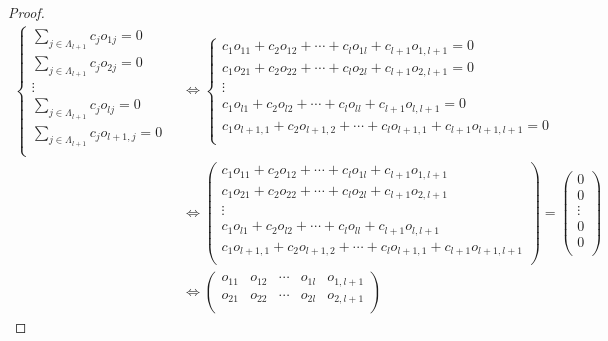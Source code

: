 \documentclass[dvipdfmx]{jsarticle}
\begin{document}
\begin{proof}
\begin{align*}
\left\{ \begin{matrix}
\sum_{j \in \varLambda_{l + 1}} {c_{j}o_{1j}} = 0 \\
\sum_{j \in \varLambda_{l + 1}} {c_{j}o_{2j}} = 0 \\
 \vdots \\
\sum_{j \in \varLambda_{l + 1}} {c_{j}o_{lj}} = 0 \\
\sum_{j \in \varLambda_{l + 1}} {c_{j}o_{l + 1,j}} = 0 \\
\end{matrix} \right.\  &\Leftrightarrow \left\{ \begin{matrix}
c_{1}o_{11} + c_{2}o_{12} + \cdots + c_{l}o_{1l} + c_{l + 1}o_{1,l + 1} = 0 \\
c_{1}o_{21} + c_{2}o_{22} + \cdots + c_{l}o_{2l} + c_{l + 1}o_{2,l + 1} = 0 \\
 \vdots \\
c_{1}o_{l1} + c_{2}o_{l2} + \cdots + c_{l}o_{ll} + c_{l + 1}o_{l,l + 1} = 0 \\
c_{1}o_{l + 1,1} + c_{2}o_{l + 1,2} + \cdots + c_{l}o_{l + 1,1} + c_{l + 1}o_{l + 1,l + 1} = 0 \\
\end{matrix} \right.\ \\
&\Leftrightarrow \begin{pmatrix}
c_{1}o_{11} + c_{2}o_{12} + \cdots + c_{l}o_{1l} + c_{l + 1}o_{1,l + 1} \\
c_{1}o_{21} + c_{2}o_{22} + \cdots + c_{l}o_{2l} + c_{l + 1}o_{2,l + 1} \\
 \vdots \\
c_{1}o_{l1} + c_{2}o_{l2} + \cdots + c_{l}o_{ll} + c_{l + 1}o_{l,l + 1} \\
c_{1}o_{l + 1,1} + c_{2}o_{l + 1,2} + \cdots + c_{l}o_{l + 1,1} + c_{l + 1}o_{l + 1,l + 1} \\
\end{pmatrix} = \begin{pmatrix}
0 \\
0 \\
 \vdots \\
0 \\
0 \\
\end{pmatrix}\\
&\Leftrightarrow \begin{pmatrix}
o_{11} & o_{12} & \cdots & o_{1l} & o_{1,l + 1} \\
o_{21} & o_{22} & \cdots & o_{2l} & o_{2,l + 1} \\

\end{pmatrix}
\end{align*}
\end{proof}
\end{document}
